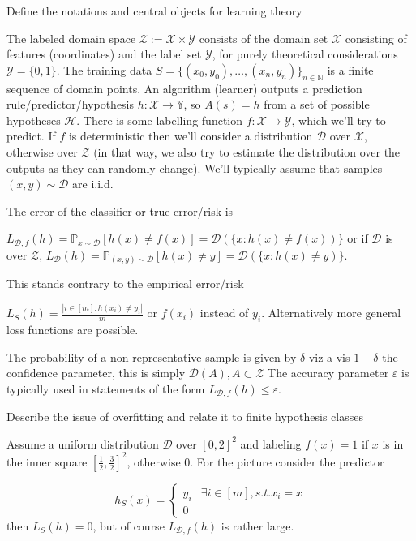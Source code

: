 \documentclass[11pt,a4paper,twoside]{article}
\begin{document}
Define the notations and central objects for learning theory

The labeled domain space \( \mathcal{Z} := \mathcal{X} \times \mathcal{Y} \)
consists of the domain set \( \mathcal{X} \) consisting of features (coordinates)
and the label set \( \mathcal{Y} \), for purely theoretical considerations \( \mathcal{Y} = \{0, 1\} \).
The training data \( S = \{ (x_0, y_0), \dots, (x_n, y_n)\}_{n \in \mathbb{N}} \) is a finite sequence of domain points.
An algorithm (learner) outputs a prediction rule/predictor/hypothesis \( h : \mathcal{X} \to \mathbb{Y} \), so \( A(s) = h \)
from a set of possible hypotheses \( \mathcal{H} \).
There is some labelling function \( f : \mathcal{X} \to \mathcal{Y} \), which we'll try to predict.
If \( f \) is deterministic then we'll consider a distribution \( \mathcal{D} \) over \( \mathcal{X} \),
otherwise over \( \mathcal{Z} \) (in that way, we also try to estimate the distribution over the outputs
as they can randomly change). We'll typically assume that samples \( (x, y) \sim \mathcal{D} \) are i.i.d.

The error of the classifier or true error/risk is

\( L_{\mathcal{D},f}(h) = \mathbb{P}_{x \sim \mathcal{D}}[h(x) \neq f(x)] = \mathcal{D}(\{x : h(x) \neq f(x))\}\)
or if \( \mathcal{D} \) is over \( \mathcal{Z} \),
\( L_{\mathcal{D}}(h) = \mathbb{P}_{(x,y) \sim \mathcal{D}}[h(x) \neq y] = \mathcal{D}(\{x : h(x) \neq y)\}\).

This stands contrary to the empirical error/risk

\( L_S(h) = \frac{|i \in [m] : h(x_i) \neq y_i|}{m} \)
or \( f(x_i) \) instead of \( y_i \). 
Alternatively more general loss functions are possible.

The probability of a non-representative sample is given by \( \delta \)
viz a vis \( 1 - \delta \) the confidence parameter, this is simply \( \mathcal{D}(A), A \subset \mathcal{Z} \)
The accuracy parameter \( \varepsilon \) is typically used in statements of the form \( L_{\mathcal{D},f}(h) \leq \varepsilon \).



Describe the issue of overfitting and relate it to finite hypothesis classes

Assume a uniform distribution \( \mathcal{D} \) over \( [0, 2]^2 \) and labeling \( f(x) = 1 \) if \( x \) is in the 
inner square \( [\frac{1}{2}, \frac{3}{2}]^2 \), otherwise \( 0 \). For the picture consider the predictor

\[
h_S(x) = \begin{cases}
  y_i & \exists i \in [m], s.t. x_i = x \\
  0
\end{cases}
\]
then \( L_S(h) = 0 \), but of course \( L_{\mathcal{D},f}(h) \) is rather large.
\end{document}
